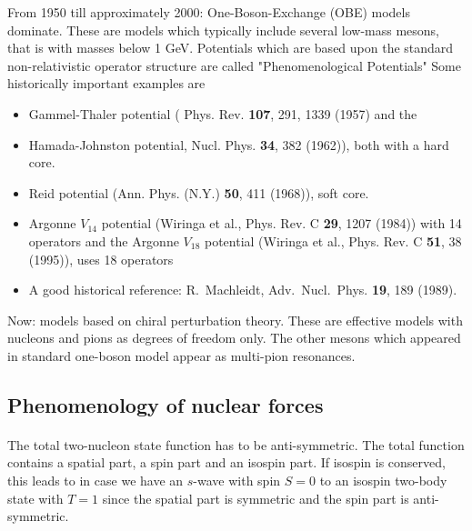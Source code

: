 \documentclass[%
twoside,                 %
final,                   %
10pt]{article}
\begin{document}
From 1950 till approximately 2000: One-Boson-Exchange (OBE) models dominate. These are models which typically include several low-mass mesons, that is with masses below 1 GeV.   Potentials which are based upon the standard non-relativistic operator structure
 are called "Phenomenological Potentials" Some historically important examples are   
\begin{itemize}
\item Gammel-Thaler potential ( Phys. Rev. \textbf{107}, 291, 1339 (1957) and the 

\item Hamada-Johnston potential, Nucl. Phys. \textbf{34}, 382 (1962)), both with a hard core.

\item Reid potential (Ann. Phys. (N.Y.) \textbf{50}, 411 (1968)), soft core.

\item Argonne $V_{14}$ potential (Wiringa et al., Phys. Rev. C \textbf{29}, 1207 (1984)) with 14 operators and  the  Argonne $V_{18}$ potential (Wiringa et al., Phys. Rev. C \textbf{51}, 38 (1995)), uses 18 operators

\item A good historical reference: R.~Machleidt, Adv.~Nucl.~Phys.  \textbf{19}, 189 (1989).
\end{itemize}

\noindent
Now: models based on chiral perturbation theory. These are effective models with nucleons and pions as degrees of freedom only. The other mesons which appeared in standard one-boson model appear as multi-pion resonances.






\subsection*{Phenomenology of nuclear forces}

\paragraph{}
The total two-nucleon state function has to be anti-symmetric. The total function contains a spatial part, a spin part and an isospin part. If isospin is conserved, this leads to in case we have an $s$-wave with spin $S=0$ to an isospin 
two-body state with $T=1$ since the spatial part is symmetric and the spin part is anti-symmetric. 
\end{document}
